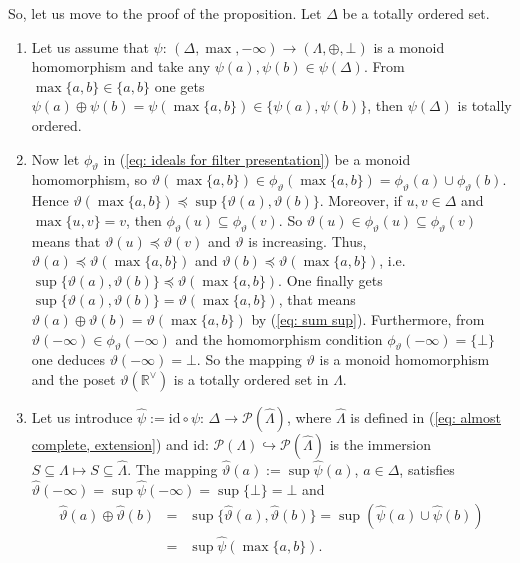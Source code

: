 \documentclass[11pt,british,reqno]{article}
\numberwithin{equation}{section}
\numberwithin{figure}{section}
\numberwithin{table}{section}
\theoremstyle{definition}
\theoremstyle{definition}
\theoremstyle{plain}
\theoremstyle{plain}
\theoremstyle{remark}
\theoremstyle{plain}
\numberwithin{equation}{section}
\numberwithin{figure}{section}
\numberwithin{table}{section}
\theoremstyle{plain}
\begin{document}
So, let us move to the proof of the proposition. Let $\Delta$ be a totally ordered set. 
\begin{enumerate}
\item Let us assume that $\psi:\,(\Delta,\max,-\infty)\longrightarrow(\Lambda,\oplus,\bot)$
is a monoid homomorphism and take any $\psi(a),\psi(b)\in\psi(\Delta)$.
From $\max\{a,b\}\in\{a,b\}$ one gets $\psi(a)\oplus\psi(b)=\psi(\max\{a,b\})\in\{\psi(a),\psi(b)\}$,
then $\psi(\Delta)$ is totally ordered. 
\item Now let $\phi_{\vartheta}$ in (\ref{eq: ideals for filter presentation})
be a monoid homomorphism, so $\vartheta(\max\{a,b\})\in\phi_{\vartheta}(\max\{a,b\})=\phi_{\vartheta}(a)\cup\phi_{\vartheta}(b)$.
Hence $\vartheta(\max\{a,b\})\preceq\sup\{\vartheta(a),\vartheta(b)\}$.
Moreover, if $u,v\in\Delta$ and $\max\{u,v\}=v$, then $\phi_{\vartheta}(u)\subseteq\phi_{\vartheta}(v)$.
So $\vartheta(u)\in\phi_{\vartheta}(u)\subseteq\phi_{\vartheta}(v)$
means that $\vartheta(u)\preceq\vartheta(v)$ and $\vartheta$ is
increasing. Thus, $\vartheta(a)\preceq\vartheta(\max\{a,b\})$ and
$\vartheta(b)\preceq\vartheta(\max\{a,b\})$, i.e. $\sup\{\vartheta(a),\vartheta(b)\}\preceq\vartheta(\max\{a,b\})$.
One finally gets $\sup\{\vartheta(a),\vartheta(b)\}=\vartheta(\max\{a,b\})$,
that means $\vartheta(a)\oplus\vartheta(b)=\vartheta(\max\{a,b\})$
by (\ref{eq: sum sup}). Furthermore, from $\vartheta(-\infty)\in\phi_{\vartheta}(-\infty)$
and the homomorphism condition $\phi_{\vartheta}(-\infty)=\{\bot\}$
one deduces $\vartheta(-\infty)=\bot$. So the mapping $\vartheta$
is a monoid homomorphism and the poset $\vartheta(\mathbb{R}^{\vee})$
is a totally ordered set in $\Lambda$. 
\item Let us introduce $\hat{\psi}:=\mathrm{id}\circ\psi:\,\Delta\longrightarrow\mathcal{P}(\hat{\Lambda})$,
where $\hat{\Lambda}$ is defined in (\ref{eq: almost complete, extension})
and $\mathrm{id}:\,\mathcal{P}(\Lambda)\hookrightarrow\mathcal{P}(\hat{\Lambda})$
is the immersion $S\subseteq\Lambda\mapsto S\subseteq\hat{\Lambda}$.
The mapping $\hat{\vartheta}(a):=\sup\hat{\psi}(a)$, $a\in\Delta$,
satisfies $\hat{\vartheta}(-\infty)=\sup\hat{\psi}(-\infty)=\sup\{\bot\}=\bot$
and 
\begin{eqnarray}
\hat{\vartheta}(a)\oplus\hat{\vartheta}(b)&=&\sup\{\hat{\vartheta}(a),\hat{\vartheta}(b)\}=\sup(\hat{\psi}(a)\cup\hat{\psi}(b))\nonumber \\
&=&\sup\hat{\psi}(\max\{a,b\}).\label{eq: compatibility reduced monoid homomorphism}
\end{eqnarray}

\end{enumerate}
\end{document}
